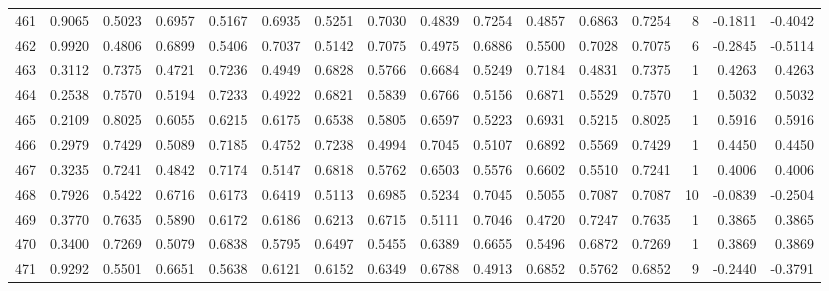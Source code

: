 \begin{tabular}{lrrrrrrrrrrrrrrr}
461 &      0.9065 &  0.5023 &  0.6957 &  0.5167 &  0.6935 &  0.5251 &  0.7030 &  0.4839 &  0.7254 &  0.4857 &   0.6863 &     0.7254 &      8 &                   -0.1811 &                    -0.4042 \\
462 &      0.9920 &  0.4806 &  0.6899 &  0.5406 &  0.7037 &  0.5142 &  0.7075 &  0.4975 &  0.6886 &  0.5500 &   0.7028 &     0.7075 &      6 &                   -0.2845 &                    -0.5114 \\
463 &      0.3112 &  0.7375 &  0.4721 &  0.7236 &  0.4949 &  0.6828 &  0.5766 &  0.6684 &  0.5249 &  0.7184 &   0.4831 &     0.7375 &      1 &                    0.4263 &                     0.4263 \\
464 &      0.2538 &  0.7570 &  0.5194 &  0.7233 &  0.4922 &  0.6821 &  0.5839 &  0.6766 &  0.5156 &  0.6871 &   0.5529 &     0.7570 &      1 &                    0.5032 &                     0.5032 \\
465 &      0.2109 &  0.8025 &  0.6055 &  0.6215 &  0.6175 &  0.6538 &  0.5805 &  0.6597 &  0.5223 &  0.6931 &   0.5215 &     0.8025 &      1 &                    0.5916 &                     0.5916 \\
466 &      0.2979 &  0.7429 &  0.5089 &  0.7185 &  0.4752 &  0.7238 &  0.4994 &  0.7045 &  0.5107 &  0.6892 &   0.5569 &     0.7429 &      1 &                    0.4450 &                     0.4450 \\
467 &      0.3235 &  0.7241 &  0.4842 &  0.7174 &  0.5147 &  0.6818 &  0.5762 &  0.6503 &  0.5576 &  0.6602 &   0.5510 &     0.7241 &      1 &                    0.4006 &                     0.4006 \\
468 &      0.7926 &  0.5422 &  0.6716 &  0.6173 &  0.6419 &  0.5113 &  0.6985 &  0.5234 &  0.7045 &  0.5055 &   0.7087 &     0.7087 &     10 &                   -0.0839 &                    -0.2504 \\
469 &      0.3770 &  0.7635 &  0.5890 &  0.6172 &  0.6186 &  0.6213 &  0.6715 &  0.5111 &  0.7046 &  0.4720 &   0.7247 &     0.7635 &      1 &                    0.3865 &                     0.3865 \\
470 &      0.3400 &  0.7269 &  0.5079 &  0.6838 &  0.5795 &  0.6497 &  0.5455 &  0.6389 &  0.6655 &  0.5496 &   0.6872 &     0.7269 &      1 &                    0.3869 &                     0.3869 \\
471 &      0.9292 &  0.5501 &  0.6651 &  0.5638 &  0.6121 &  0.6152 &  0.6349 &  0.6788 &  0.4913 &  0.6852 &   0.5762 &     0.6852 &      9 &                   -0.2440 &                    -0.3791 \\

\end{tabular}
